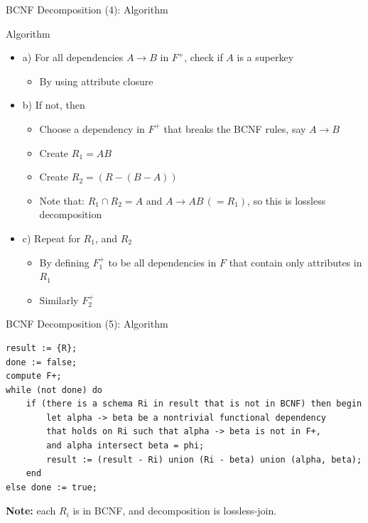 \documentclass[aspectratio=169, xcolor=dvipsnames]{beamer}
\begin{document}
\begin{frame}{BCNF Decomposition (4): Algorithm}
    \begin{exampleblock}{Algorithm}
        \begin{itemize}[<+->]
            \item a) For all dependencies $A \rightarrow B$ in $F^+$, check if $A$ is a superkey
            \begin{itemize}
                \item[$\triangleright$] By using attribute closure
            \end{itemize}
            \item b) If not, then
            \begin{itemize}
                \item[$\triangleright$] Choose a dependency in $F^+$ that breaks the BCNF rules, say $A \rightarrow B$
                \item[$\triangleright$] Create $R_1 = AB$
                \item[$\triangleright$] Create $R_2 = (R - (B - A))$
                \item[$\triangleright$] Note that: $R_1 \cap R_2 = A$ and $A \rightarrow AB \, (= R_1)$, so this is lossless decomposition
            \end{itemize}
            \item c) Repeat for $R_1$, and $R_2$
            \begin{itemize}
                \item[$\triangleright$] By defining $F_1^+$ to be all dependencies in $F$ that contain only attributes in $R_1$
                \item[$\triangleright$] Similarly $F_2^+$
            \end{itemize}
        \end{itemize}
    \end{exampleblock}
\end{frame}

\begin{frame}[fragile]{BCNF Decomposition (5): Algorithm}
    \begin{verbatim}
result := {R}; 
done := false; 
compute F+; 
while (not done) do 
    if (there is a schema Ri in result that is not in BCNF) then begin 
        let alpha -> beta be a nontrivial functional dependency 
        that holds on Ri such that alpha -> beta is not in F+, 
        and alpha intersect beta = phi; 
        result := (result - Ri) union (Ri - beta) union (alpha, beta); 
    end
else done := true;
    \end{verbatim}
    \vspace{1em}
    \textbf{Note:} each $R_i$ is in BCNF, and decomposition is lossless-join.
\end{frame}
\end{document}

